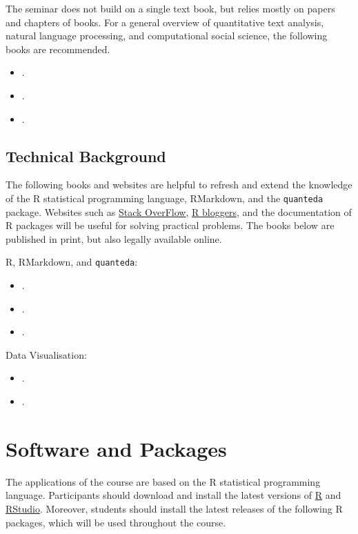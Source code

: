 \documentclass[abstract=on,parskip=full,headings=standardclasses,fontsize=11pt,paper=a4]{scrartcl}
\begin{document}
The seminar does not build on a single text book, but relies mostly on papers and chapters of books. For  a general overview of quantitative text analysis, natural language processing, and computational social science, the following books are recommended.

\begin{itemize}
\item {}.
\item {}.
\item {}.
\end{itemize}


\subsection*{Technical Background}

The following books and websites are helpful to refresh and extend the knowledge of the \textsf{R} statistical programming language, RMarkdown, and the \texttt{quanteda} package.  Websites such as \href{https://stackoverflow.com/}{Stack OverFlow}, \href{https://www.r-bloggers.com}{R bloggers}, and the documentation of \textsf{R} packages will be useful for solving practical problems. The books below are published in print, but also legally available online.

\textsf{R}, RMarkdown, and \texttt{quanteda}:
\begin{itemize}
\item {}.
\item {}.
\item {}.
\end{itemize}

Data Visualisation: 

\begin{itemize}
\item {}.
\item {}.
\end{itemize}

\section*{Software and Packages}

The applications of the course are based on the \textsf{R} statistical programming language. Participants should download and install the latest versions of \href{https://www.r-project.org}{R} and \href{https://www.rstudio.com/products/rstudio/}{RStudio}. Moreover, students should install the latest releases of the following  \textsf{R} packages, which will be used throughout the course.
\end{document}
